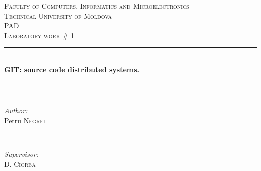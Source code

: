 \documentclass[12pt]{article}
\begin{document}
  \begin{titlepage}

 \newcommand{\HRule}{\rule{\linewidth}{0.5mm}} %
  \begin{center} %

  \textsc{\large Faculty of Computers, Informatics and Microelectronics}\\[0.5cm]
  \textsc{\large Technical University of Moldova}\\[1.2cm] %
  \vspace{35 mm}
  \textsc{\Large PAD}\\[0.5cm] %
  \textsc{\large Laboratory work \# 1}\\[0.5cm] %

  \vspace{10 mm}
  \HRule \\[0.4cm]
  { \LARGE \bfseries GIT: source code distributed systems. }\\[0.4cm] %
  \HRule \\[1.5cm]

      \vspace{35mm}

      \begin{minipage}{0.4\textwidth}
      \begin{flushleft} \large
      \emph{Author:}\\
      Petru \textsc{Negrei} %
      \end{flushleft}
      \end{minipage}
      ~
      \begin{minipage}{0.4\textwidth}
      \begin{flushright} \large
      \emph{Supervisor:} \\
      D. \textsc{Ciorba} %
      \end{flushright}
      \end{minipage}\\[4cm]


\end{center}
\end{titlepage}
\end{document}
